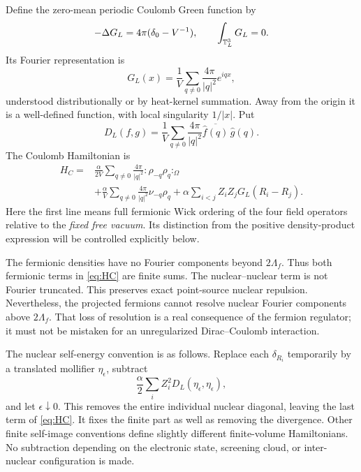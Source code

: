 Define the zero-mean periodic Coulomb Green function by
\begin{equation}
-\Delta G_L=4\pi(\delta_0-V^{-1}),\qquad \int_{\mathbb T_L^3}G_L=0.
\end{equation}
Its Fourier representation is
\begin{equation}
G_L(x)=\frac1V\sum_{q\ne0}\frac{4\pi}{|q|^2}e^{iqx},
\end{equation}
understood distributionally or by heat-kernel summation. Away from the
origin it is a well-defined function, with local singularity \(1/|x|\).
Put
\begin{equation}
D_L(f,g)=\frac1V\sum_{q\ne0}\frac{4\pi}{|q|^2}
\overline{\widehat f(q)}\,\widehat g(q).
\end{equation}
The Coulomb Hamiltonian is
\begin{align}
H_C={}&
\frac{\alpha}{2V}\sum_{q\ne0}\frac{4\pi}{|q|^2}
:\!\rho_{-q}\rho_q\!:_\Omega
\nonumber\\
&+\frac{\alpha}{V}\sum_{q\ne0}\frac{4\pi}{|q|^2}
\nu_{-q}\rho_q
+\alpha\sum_{i<j}Z_iZ_jG_L(R_i-R_j).
\label{eq:HC}
\end{align}
Here the first line means full fermionic Wick ordering of the four field
operators relative to the \emph{fixed free vacuum}. Its distinction from the
positive density-product expression will be controlled explicitly below.

The fermionic densities have no Fourier components beyond \(2\Lambda_f\).
Thus both fermionic terms in \eqref{eq:HC} are finite sums. The
nuclear--nuclear term is not Fourier truncated.
This preserves exact point-source nuclear repulsion. Nevertheless, the
projected fermions cannot resolve nuclear Fourier components above
\(2\Lambda_f\). That loss of resolution is a real consequence of the fermion
regulator; it must not be mistaken for an unregularized Dirac--Coulomb
interaction.

The nuclear self-energy convention is as follows. Replace each
\(\delta_{R_i}\) temporarily by a translated mollifier \(\eta_\epsilon\),
subtract
\begin{equation}
\frac{\alpha}{2}\sum_i Z_i^2D_L(\eta_\epsilon,\eta_\epsilon),
\label{eq:nuclear-self}
\end{equation}
and let \(\epsilon\downarrow0\). This removes the entire individual nuclear
diagonal, leaving the last term of \eqref{eq:HC}. It fixes the finite part as
well as removing the divergence. Other finite self-image conventions define
slightly different finite-volume Hamiltonians.
No subtraction depending on the electronic state, screening cloud, or
inter-nuclear configuration is made.


